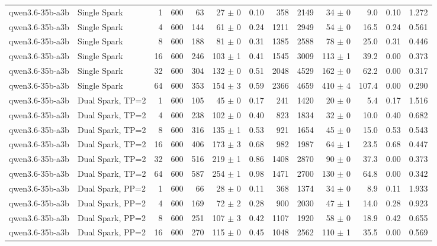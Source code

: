 \begin{tabular}{l l r r r r r r r r r r r}
\addlinespace
qwen3.6-35b-a3b & Single Spark & 1 & 600 & 63\rlap{$^\dagger$} & 27 $\pm$ 0 & 0.10 & 358 & 2149 & 34 $\pm$ 0 & 9.0 & 0.10 & 1.272 \\
qwen3.6-35b-a3b & Single Spark & 4 & 600 & 144 & 61 $\pm$ 0 & 0.24 & 1211 & 2949 & 54 $\pm$ 0 & 16.5 & 0.24 & 0.561 \\
qwen3.6-35b-a3b & Single Spark & 8 & 600 & 188 & 81 $\pm$ 0 & 0.31 & 1385 & 2588 & 78 $\pm$ 0 & 25.0 & 0.31 & 0.446 \\
qwen3.6-35b-a3b & Single Spark & 16 & 600 & 246 & 103 $\pm$ 1 & 0.41 & 1545 & 3009 & 113 $\pm$ 1 & 39.2 & 0.00 & 0.373 \\
qwen3.6-35b-a3b & Single Spark & 32 & 600 & 304 & 132 $\pm$ 0 & 0.51 & 2048 & 4529 & 162 $\pm$ 0 & 62.2 & 0.00 & 0.317 \\
qwen3.6-35b-a3b & Single Spark & 64 & 600 & 353 & 154 $\pm$ 3 & 0.59 & 2366 & 4659 & 410 $\pm$ 4 & 107.4 & 0.00 & 0.290 \\
\addlinespace
qwen3.6-35b-a3b & Dual Spark, TP=2 & 1 & 600 & 105 & 45 $\pm$ 0 & 0.17 & 241 & 1420 & 20 $\pm$ 0 & 5.4 & 0.17 & 1.516 \\
qwen3.6-35b-a3b & Dual Spark, TP=2 & 4 & 600 & 238 & 102 $\pm$ 0 & 0.40 & 823 & 1834 & 32 $\pm$ 0 & 10.0 & 0.40 & 0.682 \\
qwen3.6-35b-a3b & Dual Spark, TP=2 & 8 & 600 & 316 & 135 $\pm$ 1 & 0.53 & 921 & 1654 & 45 $\pm$ 0 & 15.0 & 0.53 & 0.543 \\
qwen3.6-35b-a3b & Dual Spark, TP=2 & 16 & 600 & 406 & 173 $\pm$ 3 & 0.68 & 982 & 1987 & 64 $\pm$ 1 & 23.5 & 0.68 & 0.447 \\
qwen3.6-35b-a3b & Dual Spark, TP=2 & 32 & 600 & 516 & 219 $\pm$ 1 & 0.86 & 1408 & 2870 & 90 $\pm$ 0 & 37.3 & 0.00 & 0.373 \\
qwen3.6-35b-a3b & Dual Spark, TP=2 & 64 & 600 & 587 & 254 $\pm$ 1 & 0.98 & 1471 & 2700 & 130 $\pm$ 0 & 64.8 & 0.00 & 0.342 \\
\addlinespace
qwen3.6-35b-a3b & Dual Spark, PP=2 & 1 & 600 & 66\rlap{$^\dagger$} & 28 $\pm$ 0 & 0.11 & 368 & 1374 & 34 $\pm$ 0 & 8.9 & 0.11 & 1.933 \\
qwen3.6-35b-a3b & Dual Spark, PP=2 & 4 & 600 & 169 & 72 $\pm$ 2 & 0.28 & 900 & 2030 & 47 $\pm$ 1 & 14.0 & 0.28 & 0.923 \\
qwen3.6-35b-a3b & Dual Spark, PP=2 & 8 & 600 & 251 & 107 $\pm$ 3 & 0.42 & 1107 & 1920 & 58 $\pm$ 0 & 18.9 & 0.42 & 0.655 \\
qwen3.6-35b-a3b & Dual Spark, PP=2 & 16 & 600 & 270 & 115 $\pm$ 0 & 0.45 & 1048 & 2562 & 110 $\pm$ 1 & 35.5 & 0.00 & 0.569 \\

\end{tabular}

